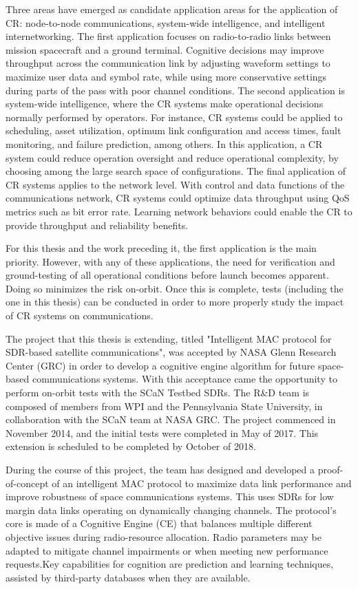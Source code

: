 \documentclass[11pt]{report}
\begin{document}
	\par Three areas have emerged as candidate application areas for the application of CR: node-to-node communications, system-wide intelligence, and intelligent internetworking. The first application focuses on radio-to-radio links between mission spacecraft and a ground terminal. Cognitive decisions may improve throughput across the communication link by adjusting waveform settings to maximize user data and symbol rate, while using more conservative settings during parts of the pass with poor channel conditions. The second application is system-wide intelligence, where the CR systems make operational decisions normally performed by operators. For instance, CR systems could be applied to scheduling, asset utilization, optimum link configuration and access times, fault monitoring, and failure prediction, among others. In this application, a CR system could reduce operation oversight and reduce operational complexity, by choosing among the large search space of configurations. The final application of CR systems applies to the network level. With control and data functions of the communications network, CR systems could optimize data throughput using QoS metrics such as bit error rate. Learning network behaviors could enable the CR to provide throughput and reliability benefits.
	\par  For this thesis and the work preceding it, the first application is the main priority. However, with any of these applications, the need for verification and ground-testing of all operational conditions before launch becomes apparent. Doing so minimizes the risk on-orbit. Once this is complete, tests (including the one in this thesis) can be conducted in order to more properly study the impact of CR systems on communications.
	\par The project that this thesis is extending, titled "Intelligent MAC protocol for SDR-based satellite communications", was accepted by NASA Glenn Research Center (GRC) in order to develop a cognitive engine algorithm for future space-based communications systems. With this acceptance came the opportunity to perform on-orbit tests with the SCaN Testbed SDRs. The R\&D team is composed of members from WPI and the Pennsylvania State University, in collaboration with the SCaN team at NASA GRC. The project commenced in November 2014, and the initial tests were completed in May of 2017. This extension is scheduled to be completed by October of 2018.
	\par During the course of this project, the team has designed and developed a proof-of-concept of an intelligent MAC protocol to maximize data link performance and improve robustness of space communications systems. This uses SDRs for low margin data links operating on dynamically changing channels. The protocol's core is made of a Cognitive Engine (CE) that balances multiple different objective issues during radio-resource allocation. Radio parameters may be adapted to mitigate channel impairments or when meeting new performance requests.Key capabilities for cognition are prediction and learning techniques, assisted by third-party databases when they are available.  
\end{document}
